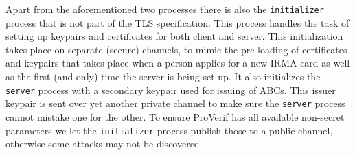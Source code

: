 Apart from the aforementioned two processes there is also the \texttt{initializer} process that is not part of the TLS specification. This process handles the task of setting up keypairs and certificates for both client and server. This initialization takes place on separate (secure) channels, to mimic the pre-loading of certificates and keypairs that takes place when a person applies for a new IRMA card as well as the first (and only) time the server is being set up. It also initializes the \texttt{server} process with a secondary keypair used for issuing of ABCs. This issuer keypair is sent over yet another private channel to make sure the \texttt{server} process cannot mistake one for the other. To ensure ProVerif has all available non-secret parameters we let the \texttt{initializer} process publish those to a public channel, otherwise some attacks may not be discovered.
